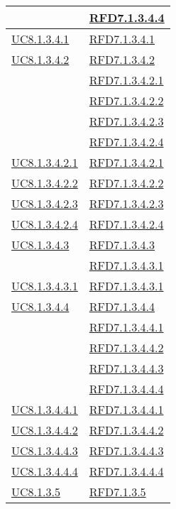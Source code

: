 \begin{longtable}{|>{\centering}m{5cm}|m{5cm}<{\centering}|}
& \hyperlink{RFD7.1.3.4.4}{RFD7.1.3.4.4}\\ \hline
\hyperref[UC8.1.3.4.1]{UC8.1.3.4.1} & \hyperlink{RFD7.1.3.4.1}{RFD7.1.3.4.1}\\ \hline
\hyperref[UC8.1.3.4.2]{UC8.1.3.4.2} & \hyperlink{RFD7.1.3.4.2}{RFD7.1.3.4.2}\\
& \hyperlink{RFD7.1.3.4.2.1}{RFD7.1.3.4.2.1}\\
& \hyperlink{RFD7.1.3.4.2.2}{RFD7.1.3.4.2.2}\\
& \hyperlink{RFD7.1.3.4.2.3}{RFD7.1.3.4.2.3}\\
& \hyperlink{RFD7.1.3.4.2.4}{RFD7.1.3.4.2.4}\\ \hline
\hyperref[UC8.1.3.4.2.1]{UC8.1.3.4.2.1} & \hyperlink{RFD7.1.3.4.2.1}{RFD7.1.3.4.2.1}\\ \hline
\hyperref[UC8.1.3.4.2.2]{UC8.1.3.4.2.2} & \hyperlink{RFD7.1.3.4.2.2}{RFD7.1.3.4.2.2}\\ \hline
\hyperref[UC8.1.3.4.2.3]{UC8.1.3.4.2.3} & \hyperlink{RFD7.1.3.4.2.3}{RFD7.1.3.4.2.3}\\ \hline
\hyperref[UC8.1.3.4.2.4]{UC8.1.3.4.2.4} & \hyperlink{RFD7.1.3.4.2.4}{RFD7.1.3.4.2.4}\\ \hline
\hyperref[UC8.1.3.4.3]{UC8.1.3.4.3} & \hyperlink{RFD7.1.3.4.3}{RFD7.1.3.4.3}\\
& \hyperlink{RFD7.1.3.4.3.1}{RFD7.1.3.4.3.1}\\ \hline
\hyperref[UC8.1.3.4.3.1]{UC8.1.3.4.3.1} & \hyperlink{RFD7.1.3.4.3.1}{RFD7.1.3.4.3.1}\\ \hline
\hyperref[UC8.1.3.4.4]{UC8.1.3.4.4} & \hyperlink{RFD7.1.3.4.4}{RFD7.1.3.4.4}\\
& \hyperlink{RFD7.1.3.4.4.1}{RFD7.1.3.4.4.1}\\
& \hyperlink{RFD7.1.3.4.4.2}{RFD7.1.3.4.4.2}\\
& \hyperlink{RFD7.1.3.4.4.3}{RFD7.1.3.4.4.3}\\
& \hyperlink{RFD7.1.3.4.4.4}{RFD7.1.3.4.4.4}\\ \hline
\hyperref[UC8.1.3.4.4.1]{UC8.1.3.4.4.1} & \hyperlink{RFD7.1.3.4.4.1}{RFD7.1.3.4.4.1}\\ \hline
\hyperref[UC8.1.3.4.4.2]{UC8.1.3.4.4.2} & \hyperlink{RFD7.1.3.4.4.2}{RFD7.1.3.4.4.2}\\ \hline
\hyperref[UC8.1.3.4.4.3]{UC8.1.3.4.4.3} & \hyperlink{RFD7.1.3.4.4.3}{RFD7.1.3.4.4.3}\\ \hline
\hyperref[UC8.1.3.4.4.4]{UC8.1.3.4.4.4} & \hyperlink{RFD7.1.3.4.4.4}{RFD7.1.3.4.4.4}\\ \hline
\hyperref[UC8.1.3.5]{UC8.1.3.5} & \hyperlink{RFD7.1.3.5}{RFD7.1.3.5}\\

\end{longtable}
